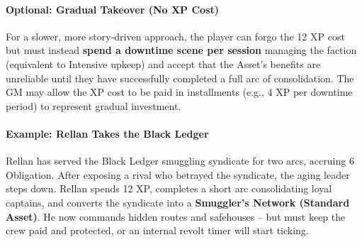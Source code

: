 \begin{tcolorbox}[colback=black!3!white,colframe=black!60!white,title=From Faction to Asset: Taking Over a Terrestrial Patron,label=sec:takeover-sidebar,breakable]
\paragraph{Optional: Gradual Takeover (No XP Cost)}
For a slower, more story‑driven approach, the player can forgo the 12 XP cost but must instead \textbf{spend a downtime scene per session} managing the faction (equivalent to Intensive upkeep) and accept that the Asset's benefits are unreliable until they have successfully completed a full arc of consolidation. The GM may allow the XP cost to be paid in installments (e.g., 4 XP per downtime period) to represent gradual investment.

\paragraph{Example: Rellan Takes the Black Ledger}
Rellan has served the Black Ledger smuggling syndicate for two arcs, accruing 6 Obligation. After exposing a rival who betrayed the syndicate, the aging leader steps down. Rellan spends 12 XP, completes a short arc consolidating loyal captains, and converts the syndicate into a \textbf{Smuggler's Network (Standard Asset)}. He now commands hidden routes and safehouses -- but must keep the crew paid and protected, or an internal revolt timer will start ticking.
\end{tcolorbox}